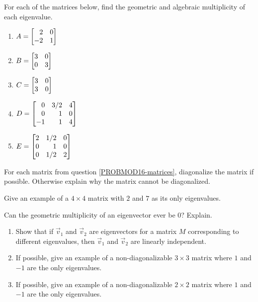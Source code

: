 \begin{exercises}
	\begin{problist}
		\prob For each of the matrices below, find the geometric and algebraic multiplicity of
		each eigenvalue. \label{PROBMOD16-matrices}
		\begin{enumerate}
			\item   $A=\mat{2&0\\-2&1}$
			\item   $B=\mat{3&0\\0&3}$
			\item   $C=\mat{3&0\\3&0}$
			\item   $D=\mat{0&3/2&4\\0&1&0\\-1&1&4}$
			\item   $E=\mat{2&1/2&0\\0&1&0\\0&1/2&2}$
		\end{enumerate}
		
		\prob For each matrix from question \ref{PROBMOD16-matrices}, diagonalize the matrix if
		possible. Otherwise explain why the matrix cannot be diagonalized.

		\prob Give an example of a $4\times 4$ matrix with $2$ and $7$ as its only eigenvalues.

		\prob Can the geometric multiplicity of an eigenvector ever be $0$? Explain.

		\prob \begin{enumerate}
			\item Show that if $\vec v_1$ and $\vec v_2$ are eigenvectors
				for a matrix $M$ corresponding to different eigenvalues,
				then $\vec v_1$ and $\vec v_2$ are linearly independent.
			\item If possible, give an example of a non-diagonalizable $3\times 3$
				matrix where $1$ and $-1$ are the only eigenvalues.
			\item If possible, give an example of a non-diagonalizable $2\times 2$
				matrix where $1$ and $-1$ are the only eigenvalues.
		\end{enumerate}
	\end{problist}
\end{exercises}
